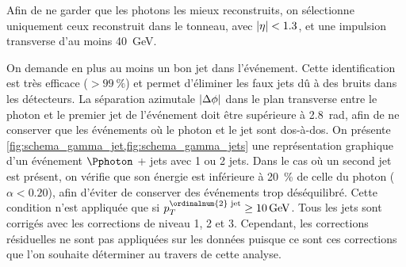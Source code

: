 Afin de ne garder que les photons les mieux reconstruits, on sélectionne uniquement ceux reconstruit dans le tonneau, avec $\lvert \eta \rvert < \num{1.3}$, et une impulsion transverse d'au moins \SI{40}{\GeV}.

\medskip

On demande en plus au moins un bon jet dans l'événement. Cette identification est très efficace ($> \SI{99}{\%}$) et permet d'éliminer les faux jets dû à des bruits dans les détecteurs. La séparation azimutale $\lvert \Delta \phi \rvert$ dans le plan transverse entre le photon et le premier jet de l'événement doit être supérieure à \SI{2.8}{\radian}, afin de ne conserver que les événements où le photon et le jet sont dos-à-dos. On présente \cref{fig:schema_gamma_jet,fig:schema_gamma_jets} une représentation graphique d'un événement $\Pphoton$ + jets avec 1 ou 2 jets. Dans le cas où un second jet est présent, on vérifie que son énergie est inférieure à \SI{20}{\%} de celle du photon ($\alpha < \num{0.20}$), afin d'éviter de conserver des événements trop déséquilibré. Cette condition n'est appliquée que si $p_T^{\text{\ordinalnum{2} jet}} \geq \SI{10}{\GeV}$. Tous les jets sont corrigés avec les corrections de niveau 1, 2 et 3. Cependant, les corrections résiduelles ne sont pas appliquées sur les données puisque ce sont ces corrections que l'on souhaite déterminer au travers de cette analyse.

